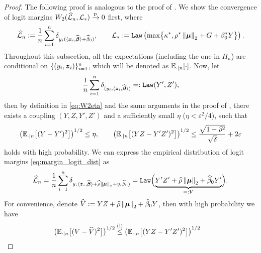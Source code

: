 \begin{proof}
The following proof is analogous to the proof of \cite[Theorem 4.6]{montanari2022overparametrizedlineardimensionalityreductions}. We show the convergence of logit margins $W_2( \widehat{\mathcal{L}}_n, \mathcal{L}_* ) \xrightarrow{\mathrm{p}} 0$ first, where
\begin{equation}
    \label{eq:margin_logit_dist}
    \widehat {\mathcal{L}}_{n} := \frac1n \sum_{i=1}^n \delta_{y_i ( \langle \text{\boldmath $x$}_i, \widehat{{\boldsymbol{\beta}}} \rangle + \widehat\beta_{0} ) },
    \qquad 
    \mathcal{L}_* := \mathtt{Law}\left( 
    \max\bigl\{ \kappa^*,  \rho^*\left\|{{\boldsymbol{\mu}}}\right\|_2 + G + \beta_0^* Y    \bigr\}
    \right).
\end{equation}
Throughout this subsection, all the expectations (including the one in $H_\kappa$) are conditional on $\{ (y_i, \text{\boldmath $z$}_i) \}_{i=1}^n$, which will be denoted as $\mathbb{E}_{\cdot | n}[\cdot]$. Now, let
\begin{equation*}
    \frac1n \sum_{i=1}^n \delta_{(y_i, \langle \text{\boldmath $z$}_i, \widehat{{\boldsymbol{\beta}}} \rangle)} =: \mathtt{Law}(Y', Z'),
\end{equation*}
then by definition in \cref{eq:W2eta} and the same arguments in the proof of \cite[Theorem 4.6]{montanari2022overparametrizedlineardimensionalityreductions}, there exists a coupling $(Y, Z, Y', Z')$ and a sufficiently small $\eta$ ($\eta < \varepsilon^2/4$), such that
\begin{equation}
    \label{eq:pursuit_pre}
    \left( \mathbb{E}_{\cdot | n}\bigl[(Y - Y')^2\bigr] \right)^{1/2} \le \eta,
    \qquad
    \left( \mathbb{E}_{\cdot | n}\bigl[(YZ - Y'Z')^2\bigr] \right)^{1/2} \le \frac{\sqrt{1 - \widehat\rho^2}}{\sqrt{\delta}} + 2\varepsilon
\end{equation}
holds with high probability. 
We can express the empirical distribution of logit margins \cref{eq:margin_logit_dist} as
\begin{equation}
    \label{eq:emp_ell}
    \widehat {\mathcal{L}}_{n}
    = \frac1n \sum_{i=1}^n \delta_{y_i \langle \text{\boldmath $z$}_i, \widehat{{\boldsymbol{\beta}}} \rangle + \widehat\rho \left\|{{\boldsymbol{\mu}}}\right\|_2 + y_i \widehat\beta_0 ) }
    = \mathtt{Law} \Bigl( \underbrace{Y'Z' + \widehat\rho \left\|{{\boldsymbol{\mu}}}\right\|_2 + \widehat\beta_0 Y' }_{=: V} \Bigr).
\end{equation}
For convenience, denote $\widehat V := YZ + \widehat\rho \left\|{{\boldsymbol{\mu}}}\right\|_2 + \widehat\beta_0 Y$, then with high probability we have
\begin{align}
        \bigl( \E_{\cdot | n}\bigl[(V - \hat V)^2\bigr] \bigr)^{1/2}
        & \overset{\mathmakebox[0pt][c]{\text{(i)}}}{\le} \left( \E_{\cdot | n}\bigl[(YZ - Y'Z')^2\bigr] \right)^{1/2} 

\end{align}
\end{proof}
